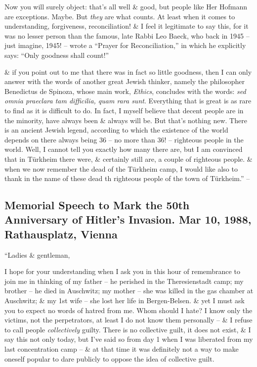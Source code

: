 \documentclass{article}
\numberwithin{equation}{section}
\begin{document}
Now you will surely object: that's all well \& good, but people like Her Hofmann are exceptions. Maybe. But \textit{they} are what counts. At least when it comes to understanding, forgiveness, reconciliation! \& I feel it legitimate to say this, for it was no lesser person than the famous, late Rabbi Leo Baeck, who back in 1945 -- just imagine, 1945! -- wrote a ``Prayer for Reconciliation,'' in which he explicitly says: ``Only goodness shall count!''

\& if you point out to me that there was in fact so little goodness, then I can only answer with the words of another great Jewish thinker, namely the philosopher Benedictus de Spinoza, whose main work, \textit{Ethics}, concludes with the words: \textit{sed omnia praeclara tam difficilia, quam rara sunt}. Everything that is great is as rare to find as it is difficult to do. In fact, I myself believe that decent people are in the minority, have always been \& always will be. But that's nothing new. There is an ancient Jewish legend, according to which the existence of the world depends on there always being 36 -- no more than 36! -- righteous people in the world. Well, I cannot tell you exactly how many there are, but I am convinced that in T\"urkheim there were, \& certainly still are, a couple of righteous people. \& when we now remember the dead of the T\"urkheim camp, I would like also to thank in the name of these dead th righteous people of the town of T\"urkheim.'' -- \cite[pp. 120--122]{Frankl2017}

\subsection{Memorial Speech to Mark the 50th Anniversary of Hitler's Invasion. Mar 10, 1988, Rathausplatz, Vienna}
``Ladies \& gentleman,

I hope for your understanding when I ask you in this hour of remembrance to join me in thinking of my father -- he perished in the Theresienstadt camp; my brother -- he died in Auschwitz; my mother -- she was killed in the gas chamber at Auschwitz; \& my 1st wife -- she lost her life in Bergen-Belsen. \& yet I must ask you to expect no words of hatred from me. Whom should I hate? I know only the victims, not the perpetrators, at least I do not know them personally -- \& I refuse to call people \textit{collectively} guilty. There is no collective guilt, it does not exist, \& I say this not only today, but I've said so from day 1 when I was liberated from my last concentration camp -- \& at that time it was definitely not a way to make oneself popular to dare publicly to oppose the idea of collective guilt.
\end{document}
